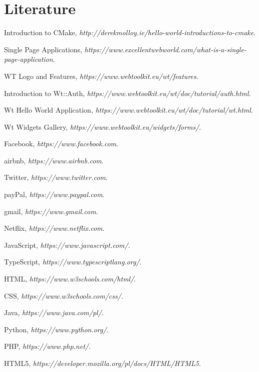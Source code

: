 \documentclass[a4paper,12pt]{book}
\begin{document}
\chapter{Literature}
{
\begin{thebibliography}{9}
  Introduction to CMake,
  \emph{http://derekmolloy.ie/hello-world-introductions-to-cmake}.
  
  Single Page Applications,
  \emph{https://www.excellentwebworld.com/what-is-a-single-page-application}.
  
  WT Logo and Features,
  \emph{https://www.webtoolkit.eu/wt/features}.

  Introduction to Wt::Auth,
  \emph{https://www.webtoolkit.eu/wt/doc/tutorial/auth.html}.
  
  Wt Hello World Application,
  \emph{https://www.webtoolkit.eu/wt/doc/tutorial/wt.html}.

  Wt Widgets Gallery,
  \emph{https://www.webtoolkit.eu/widgets/forms/}.
  
  Facebook,
  \emph{https://www.facebook.com}.
  
  airbnb,
  \emph{https://www.airbnb.com}.
  
  Twitter,
  \emph{https://www.twitter.com}.
  
  payPal,
  \emph{https://www.paypal.com}.
  
  gmail,
  \emph{https://www.gmail.com}.
  
  Netflix,
  \emph{https://www.netflix.com}.

  JavaScript,
  \emph{https://www.javascript.com/}.
  
  TypeScript,
  \emph{https://www.typescriptlang.org/}.
  
  HTML,
  \emph{https://www.w3schools.com/html/}.
  
  CSS,
  \emph{https://www.w3schools.com/css/}.
 
  Java,
  \emph{https://www.java.com/pl/}.
  
  Python,
  \emph{https://www.python.org/}.
  
  PHP,
  \emph{https://www.php.net/}.
  
  HTML5,
  \emph{https://developer.mozilla.org/pl/docs/HTML/HTML5}.
  

\end{thebibliography}}
\end{document}
